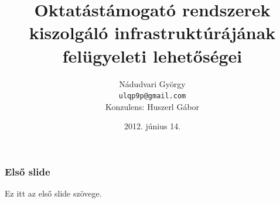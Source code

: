 \documentclass{beamer}
\makeatletter
\newcommand{\vikszerzo}{Nádudvari György}
\newcommand{\vikszerzomail}{ulqp9p@gmail.com}
\newcommand{\vikkonzulens}{Huszerl Gábor}
\newcommand{\vikcim}{Oktatástámogató rendszerek kiszolgáló infrastruktúrájának felügyeleti lehetőségei}
\makeatother
\begin{document}
\title{\vikcim}
\author{\vikszerzo \\ \texttt{\vikszerzomail} \\[0.5cm] Konzulens: \vikkonzulens}
\date{2012. június 14.}

\begin{frame}[plain]
\titlepage
\end{frame}

\begin{frame}
\frametitle{Első slide}
Ez itt az első slide szövege.
\end{frame}
\end{document}
